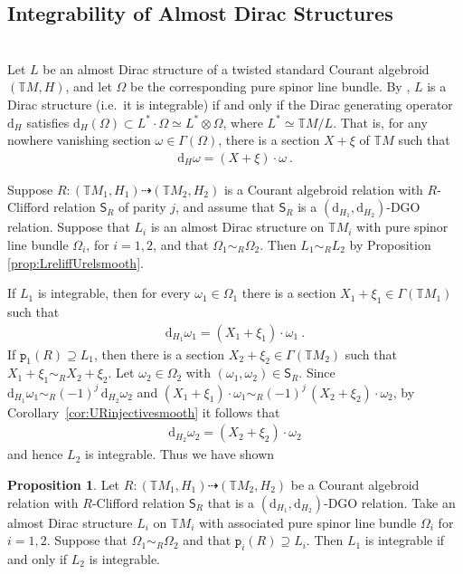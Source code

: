 \documentclass[a4paper, reqno, 11pt]{amsart}
\numberwithin{equation}{section}
\theoremstyle{definition}
\newtheorem{proposition}[equation]{Proposition}
\newcommand{\sfgamma}{\mathsf{\Gamma}}
\newcommand{\de}{\mathrm{d}}
\newcommand{\rmp}{\mathtt{p}}
\newcommand{\IT}{\mathbb{T}}
\newcommand{\sfS}{{\mathsf{S}}}
\newcommand{\sfGamma}{{\mathsf{\Gamma}}}
\newcommand{\rel}{\dashrightarrow}
\theoremstyle{remark}
\begin{document}
\medskip

\subsection{Integrability of Almost Dirac Structures}~\\[5pt]
Let $L$ be an almost Dirac structure of a twisted standard Courant algebroid $(\IT M, H)$, and let $\Omega$ be the corresponding pure spinor line bundle. By \cite[Proposition 3.44]{gualtieri:tesi}, $L$ is a Dirac structure (i.e.~it is integrable) if and only if the Dirac generating operator $\de_H$ satisfies $\de_H(\Omega) \subset L^* \cdot \Omega\simeq L^*\otimes\Omega$, where $L^*\simeq\IT M/L$. That is, for any nowhere vanishing section $\omega \in \sfGamma(\Omega)$, there is a section $X+\xi$ of $\IT M$ such that 
\begin{align}
    \de_H \omega = (X+\xi)\cdot\omega \ .
\end{align}

Suppose $R \colon (\IT M_1, H_1) \rel (\IT M_2, H_2)$ is a Courant algebroid relation with $R$-Clifford relation $\sfS_R$ of parity $j$, and assume that $\sfS_R$ is a $(\de_{H_1}, \de_{H_2})$-DGO relation. Suppose that $L_i$ is an almost Dirac structure on $\IT M_i$ with pure spinor line bundle $\Omega_i$, for $i=1,2$, and that $\Omega_1 \sim_R \Omega_2$. Then $L_1 \sim_R L_2$ by Proposition \ref{prop:LreliffUrelsmooth}. 

If $L_1$ is integrable, then for every $\omega_1 \in \Omega_1$ there is a section $X_1+\xi_1\in \sfgamma(\IT M_1)$ such that 
\begin{align}
    \de_{H_1} \omega_1 = (X_1+\xi_1) \cdot \omega_1 \ .
\end{align}
If $\rmp_1(R) \supseteq L_1$, then there is a section $X_2 + \xi_2 \in \sfGamma(\IT M_2)$  such that $X_1+ \xi_1 \sim_R X_2 + \xi_2$. Let $\omega_2 \in \Omega_2$ with $(\omega_1, \omega_2) \in \sfS_R$. Since $\de_{H_1}\omega_1 \sim_R(-1)^j\,\de_{H_2} \omega_2$ and $(X_1+\xi_1)\cdot \omega_1 \sim_R (-1)^j\,(X_2+\xi_2)\cdot \omega_2$, by Corollary~\ref{cor:URinjectivesmooth} it follows that
\begin{align}
    \de_{H_2} \omega_2 = (X_2 + \xi_2) \cdot \omega_2
\end{align}
and hence $L_2$ is integrable. Thus we have shown

\begin{proposition}\label{prop:integrabilityrelation}
    Let $R \colon (\IT M_1, H_1) \rel (\IT M_2, H_2)$ be a Courant algebroid relation with $R$-Clifford relation $\sfS_R$ that is a $(\de_{H_1}, \de_{H_2})$-DGO relation. Take an almost Dirac structure $L_i$ on $\IT M_i$ with associated pure spinor line bundle $\Omega_i$ for $i=1,2$. Suppose that $\Omega_1 \sim_R \Omega_2$ and that $\rmp_i(R) \supseteq L_i$. Then $L_1$ is integrable if and only if $L_2$ is integrable.
\end{proposition}
\end{document}
